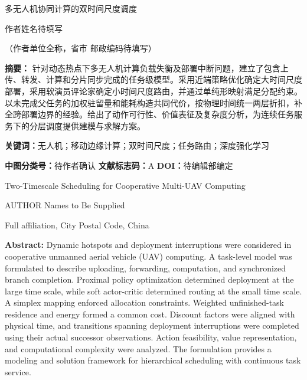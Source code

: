 \thispagestyle{empty}
\begin{center}
{\JournalChineseTitle 多无人机协同计算的双时间尺度调度\par}
\vspace{8mm}
{\JournalChineseAuthor 作者姓名待填写\par}
\vspace{3mm}
{\JournalAffiliation （作者单位全称，省市 邮政编码待填写）\par}
\end{center}
\vspace{5mm}
\begingroup
\JournalAbstract
\noindent\textbf{摘\quad 要：}
针对动态热点下多无人机计算负载失衡及部署中断问题，建立了包含上传、转发、计算和分片同步完成的任务级模型。采用近端策略优化确定大时间尺度部署，采用软演员评论家确定小时间尺度路由，并通过单纯形映射满足分配约束。以未完成父任务的加权驻留量和能耗构造共同代价，按物理时间统一两层折扣，补全跨部署边界的经验。给出了动作可行性、价值表征及复杂度分析，为连续任务服务下的分层调度提供建模与求解方案。

\vspace{3mm}
\noindent\textbf{关键词：}无人机；移动边缘计算；双时间尺度；任务路由；深度强化学习

\vspace{3mm}
\noindent\textbf{中图分类号：}待作者确认\qquad
\textbf{文献标志码：}A\qquad
\textbf{DOI：}待编辑部编定
\par\endgroup

\vspace{10mm}
\begin{center}
{\JournalEnglishTitle Two-Timescale Scheduling for Cooperative Multi-UAV Computing\par}
\vspace{4mm}
{\JournalEnglishAuthor AUTHOR Names to Be Supplied\par}
\vspace{2mm}
{\JournalAffiliation Full affiliation, City Postal Code, China\par}
\end{center}
\vspace{4mm}
\begingroup
\JournalAbstract
\noindent\textbf{Abstract:}
Dynamic hotspots and deployment interruptions were considered in cooperative unmanned aerial vehicle (UAV) computing. A task-level model was formulated to describe uploading, forwarding, computation, and synchronized branch completion. Proximal policy optimization determined deployment at the large time scale, while soft actor-critic determined routing at the small time scale. A simplex mapping enforced allocation constraints. Weighted unfinished-task residence and energy formed a common cost. Discount factors were aligned with physical time, and transitions spanning deployment interruptions were completed using their actual successor observations. Action feasibility, value representation, and computational complexity were analyzed. The formulation provides a modeling and solution framework for hierarchical scheduling with continuous task service.

